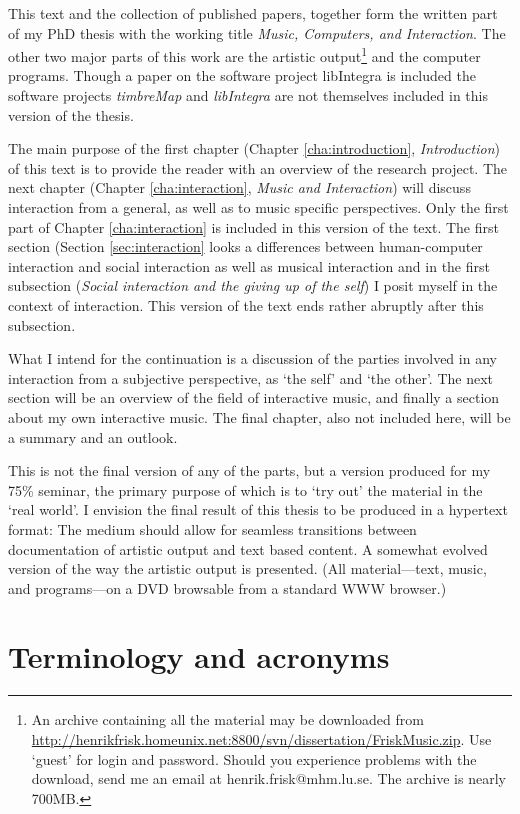 This text and the collection of published papers, together form the
written part of my PhD thesis with the working title \emph{Music,
Computers, and Interaction}. The other two major parts of this work
are the artistic output\footnote{An archive containing all the
  material may be downloaded from
  \url{http://henrikfrisk.homeunix.net:8800/svn/dissertation/FriskMusic.zip}. 
Use `guest' for login and password. Should you experience problems
with the download, send me an email at henrik.frisk@mhm.lu.se. The
archive is nearly 700MB.} 
and the computer programs. Though a paper on the software project
libIntegra is included the software projects \emph{timbreMap} and \emph{libIntegra}
are not themselves included in this version of the thesis.

The main purpose of the first chapter (Chapter \ref{cha:introduction},
\emph{Introduction}) of this text is to provide the reader with an
overview of the research project. The next chapter (Chapter
\ref{cha:interaction}, \emph{Music and Interaction}) will discuss
interaction from a general, as well as to music specific
perspectives. Only the first part of Chapter \ref{cha:interaction} is
included in this version of the text. The first section (Section
\ref{sec:interaction} looks a differences between human-computer
interaction and social interaction as well as musical interaction and
in the first subsection (\emph{Social interaction and the giving up of
  the self}) I posit myself in the context of interaction. This
version of the text ends rather abruptly after this subsection.

What I intend for the continuation is a discussion of the parties
involved in any interaction from a subjective perspective, as `the
self' and `the other'. The next section will be an overview of the
field of interactive music, and finally a section about my own
interactive music. The final chapter, also not included here, will be
a summary and an outlook.

This is not the final version of any of the parts, but a version
produced for my 75\% seminar, the primary purpose of which is to `try
out' the material in the `real world'. I envision the final result of
this thesis to be produced in a hypertext format: The medium should
allow for seamless transitions between documentation of artistic
output and text based content. A somewhat evolved version of the way
the artistic output is presented.  (All material---text, music, and
programs---on a DVD browsable from a standard WWW browser.)
\clearpage
\section{Terminology and acronyms}
\label{sec:terminology}

